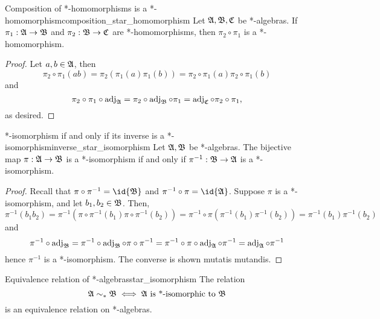 \begin{lemma}{Composition of *-homomorphisms is a *-homomorphism}{composition_star_homomorphism}
    Let \(\mathfrak{A}, \mathfrak{B}, \mathfrak{C}\) be *-algebras. If \(\pi_1 : \mathfrak{A} \to \mathfrak{B}\) and \(\pi_2 : \mathfrak{B} \to \mathfrak{C}\) are *-homomorphisms, then \(\pi_2 \circ \pi_1\) is a *-homomorphism.
\end{lemma}
\begin{proof}
    Let \(a, b \in \mathfrak{A}\), then
    \begin{equation*}
        \pi_2\circ \pi_1(ab) = \pi_2(\pi_1(a) \pi_1(b)) = \pi_2\circ \pi_1(a) \pi_2\circ\pi_1(b)
    \end{equation*}
    and
    \begin{equation*}
        \pi_2\circ \pi_1 \circ \operatorname{adj}_{\mathfrak{A}} = \pi_2 \circ \operatorname{adj}_{\mathfrak{B}} \circ \pi_1 = \operatorname{adj}_{\mathfrak{C}} \circ \pi_2 \circ \pi_1,
    \end{equation*}
    as desired.
\end{proof}
\begin{lemma}{*-isomorphism if and only if its inverse is a *-isomorphism}{inverse_star_isomorphism}
    Let \(\mathfrak{A}, \mathfrak{B}\) be *-algebras. The bijective map \(\pi : \mathfrak{A} \to \mathfrak{B}\) is a *-isomorphism if and only if \(\pi^{-1} : \mathfrak{B} \to \mathfrak{A}\) is a *-isomorphism.
\end{lemma}
\begin{proof}
    Recall that \(\pi \circ \pi^{-1} = \id{\algebra{B}}\) and \(\pi^{-1} \circ \pi = \id{\algebra{A}}\). Suppose \(\pi\) is a *-isomorphism, and let \(b_1, b_2 \in \mathfrak{B}\). Then,
    \begin{equation*}
        \pi^{-1} (b_1b_2) = \pi^{-1} \left(\pi\circ \pi^{-1}(b_1)\pi\circ \pi^{-1}(b_2)\right) = \pi^{-1} \circ \pi \left(\pi^{-1}(b_1)\pi^{-1}(b_2)\right) = \pi^{-1}(b_1) \pi^{-1}(b_2)
    \end{equation*}
    and
    \begin{equation*}
        \pi^{-1} \circ \operatorname{adj}_{\mathfrak{B}} = \pi^{-1} \circ \operatorname{adj}_{\mathfrak{B}} \circ \pi \circ \pi^{-1} = \pi^{-1} \circ \pi \circ \operatorname{adj}_{\mathfrak{A}} \circ \pi^{-1} = \operatorname{adj}_{\mathfrak{A}}\circ \pi^{-1}
    \end{equation*}
    hence \(\pi^{-1}\) is a *-isomorphism. The converse is shown mutatis mutandis.
\end{proof}
\begin{proposition}{Equivalence relation of *-algebras}{star_isomorphism}
    The relation
    \begin{equation*}
        \mathfrak{A} \sim_* \mathfrak{B} \iff \mathfrak{A}\text{ is *-isomorphic to }\mathfrak{B}
    \end{equation*}
    is an equivalence relation on *-algebras.
\end{proposition}
